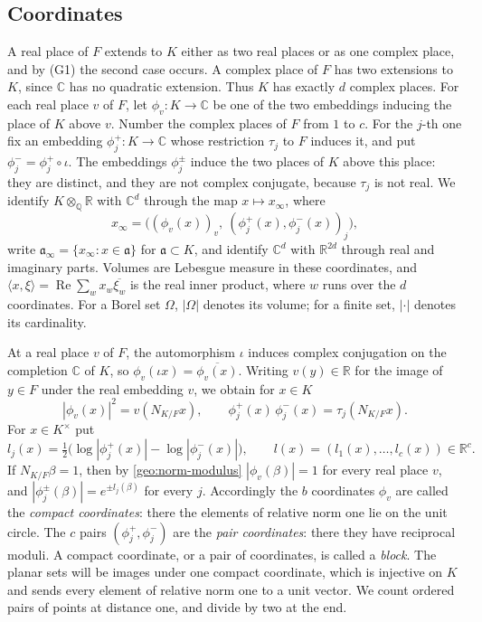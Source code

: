 \documentclass[11pt]{amsart}
\numberwithin{equation}{section}
\theoremstyle{definition}
\theoremstyle{remark}
\newcommand{\Q}{\mathbb Q}
\newcommand{\R}{\mathbb R}
\newcommand{\C}{\mathbb C}
\begin{document}
\subsection{Coordinates}
A real place of $F$ extends to $K$ either as two real places or as one
complex place, and by (G1) the second case occurs. A complex place of
$F$ has two extensions to $K$, since $\C$ has no quadratic extension.
Thus $K$ has exactly $d$ complex places. For each real place $v$ of
$F$, let $\phi_v\colon K\to\C$ be one of the two embeddings inducing
the place of $K$ above $v$. Number the complex places of $F$ from $1$
to $c$. For the $j$-th one fix an embedding $\phi_j^+\colon K\to\C$
whose restriction $\tau_j$ to $F$ induces it, and put
$\phi_j^-=\phi_j^+\circ\iota$. The embeddings $\phi_j^\pm$ induce
the two places of $K$ above this place: they are distinct, and they are
not complex conjugate, because $\tau_j$ is not real. We identify
$K\otimes_\Q\R$ with $\C^d$ through the map $x\mapsto x_\infty$, where
\[
 x_\infty=\bigl((\phi_v(x))_v,\ (\phi_j^+(x),\phi_j^-(x))_{j}\bigr),
\]
write $\mathfrak a_\infty=\{x_\infty:x\in\mathfrak a\}$ for
$\mathfrak a\subset K$, and identify $\C^d$ with $\R^{2d}$ through real
and imaginary parts. Volumes are Lebesgue measure in these coordinates,
and $\langle x,\xi\rangle=\operatorname{Re}\sum_w x_w\overline{\xi_w}$
is the real inner product, where $w$ runs over the $d$ coordinates. For a
Borel set $\Omega$, $|\Omega|$ denotes its volume; for a finite set, $|\cdot|$
denotes its cardinality.

At a real place $v$ of $F$, the automorphism $\iota$ induces complex
conjugation on the completion $\C$ of $K$, so
$\phi_v(\iota x)=\overline{\phi_v(x)}$. Writing $v(y)\in\R$ for the
image of $y\in F$ under the real embedding $v$, we obtain for $x\in K$
\begin{equation}\label{geo:norm-modulus}
 |\phi_v(x)|^2=v(N_{K/F}x),\qquad
 \phi_j^+(x)\,\phi_j^-(x)=\tau_j(N_{K/F}x).
\end{equation}
For $x\in K^\times$ put
\[
 l_j(x)=\tfrac12\bigl(\log|\phi_j^+(x)|-\log|\phi_j^-(x)|\bigr),
 \qquad l(x)=(l_1(x),\dots,l_c(x))\in\R^c .
\]
If $N_{K/F}\beta=1$, then by \eqref{geo:norm-modulus}
$|\phi_v(\beta)|=1$ for every real place $v$, and
$|\phi_j^\pm(\beta)|=e^{\pm l_j(\beta)}$ for every $j$. Accordingly the
$b$ coordinates $\phi_v$ are called the \emph{compact coordinates}:
there the elements of relative norm one lie on the unit circle. The $c$
pairs $(\phi_j^+,\phi_j^-)$ are the \emph{pair coordinates}: there
they have reciprocal moduli. A compact coordinate, or a pair of
coordinates, is called a \emph{block}. The planar sets will be images
under one compact coordinate, which is injective on $K$ and sends every
element of relative norm one to a unit vector. We count ordered pairs of
points at distance one, and divide by two at the end.
\end{document}
